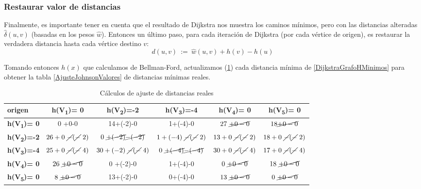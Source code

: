 \documentclass[../tp2_grupo404.tex]{subfiles}
\begin{document}
\subsubsection{Restaurar valor de distancias}\label{sec:parte1_4_3}
Finalmente, es importante tener en cuenta que el resultado de Dijkstra
nos muestra los caminos mínimos, pero con las distancias alteradas $\hat{\delta}(u,v)$
(basadas en los pesos $\hat{w}$). Entonces un último paso, para cada
iteración de Dijkstra (por cada vértice de origen), es restaurar la
verdadera distancia hasta cada vértice destino $v$:
$$d(u,v) ~:=~ \hat{w}(u,v) + h(v) - h(u)$$

Tomando entonces $h(x)$ que calculamos de Bellman-Ford,
actualizamos (\cref{AjusteJohnsonCalculos}) cada distancia mínima de \cref{DijkstraGrafoHMinimos}
para obtener la tabla \cref{AjusteJohnsonValores} de distancias mínimas reales.

\begin{table}[H]
    \centering
    \begin{tabular}{@{}lccccc@{}}
    \toprule
    \textbf{origen}
    & \textbf{h(V\textsubscript{1})= 0}
    & \textbf{h(V\textsubscript{2})=-2}
    & \textbf{h(V\textsubscript{3})=-4}
    & \textbf{h(V\textsubscript{4})= 0}
    & \textbf{h(V\textsubscript{5})= 0} \\ \midrule
    \textbf{h(V\textsubscript{1})= 0}  & 0 +0-0  & 14+(-2)-0  & 1+(-4)-0  & $27~\cancel{+0-0}$  & $18\cancel{+0-0}$  \\
    \textbf{h(V\textsubscript{2})=-2}  & $26+0~\cancel{-}(\cancel{-}~2)$  & $0 ~\cancel{+(-2)}\cancel{-(-2)}$  & $1+(-4)~\cancel{-}(\cancel{-}~2)$  & $13+0~\cancel{-}(\cancel{-}~2)$  & $18+0~\cancel{-}(\cancel{-}~2)$  \\
    \textbf{h(V\textsubscript{3})=-4}  & $25+0~\cancel{-}(\cancel{-}~4)$  & $30+(-2)~\cancel{-}(\cancel{-}~4)$  & $0~\cancel{+(-4)}\cancel{-(-4)}$  & $30+0~\cancel{-}(\cancel{-}~4)$  & $17+0~\cancel{-}(\cancel{-}~4)$  \\
    \textbf{h(V\textsubscript{4})= 0}  & $26~\cancel{+0-0}$  & 0 +(-2)-0  & 1+(-4)-0  & $0~\cancel{+0-0}$  & $18~\cancel{+0-0}$  \\
    \textbf{h(V\textsubscript{5})= 0}  & $8~ \cancel{+0-0}$  & 13+(-2)-0  & 0+(-4)-0  & $13~\cancel{+0-0}$  & $0 ~\cancel{+0-0}$  \\ \bottomrule
    \end{tabular}
    \caption{Cálculos de ajuste de distancias reales}
    \label{AjusteJohnsonCalculos}
\end{table}
\end{document}

